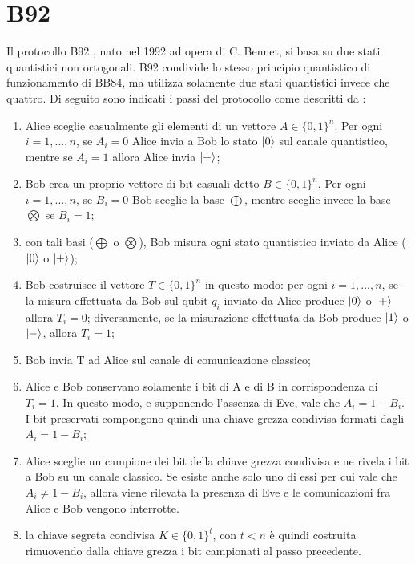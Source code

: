 \section{B92}
Il protocollo B92 \cite{b92}, nato nel 1992 ad opera di C. Bennet, si basa su due stati quantistici non ortogonali. B92 condivide lo stesso principio quantistico di funzionamento di BB84, ma utilizza solamente due stati quantistici invece che quattro.
Di seguito sono indicati i passi del protocollo come descritti da \cite{elboukhari}:
\begin{enumerate}
    \item  Alice sceglie casualmente gli elementi di un vettore $A \in \{0,1\}^n$. Per ogni $i=1,...,n$, se $A_i = 0$ Alice invia a Bob lo stato $\ket{0}$ sul canale quantistico, mentre se $A_i = 1$ allora Alice invia $\ket{+}$;
    \item Bob crea un proprio vettore di bit casuali detto $B \in \{0,1\}^n$. Per ogni $i=1,...,n$, se $B_i = 0$ Bob sceglie la base $\bigoplus$, mentre sceglie invece la base $\bigotimes$ se $B_i = 1$;
    \item con tali basi ($\bigoplus$ o $\bigotimes$), Bob misura ogni stato quantistico inviato da Alice ($\ket{0}$ o $\ket{+}$);
    \item Bob costruisce il vettore $T \in \{0, 1\}^n$ in questo modo: per ogni $i=1,...,n$, se la misura effettuata da Bob sul qubit $q_i$ inviato da Alice produce $\ket{0}$ o $\ket{+}$ allora $T_i = 0$; diversamente, se la misurazione effettuata da Bob produce $\ket{1}$ o $\ket{-}$, allora $T_i = 1$;
    \item Bob invia T ad Alice sul canale di comunicazione classico;
    \item Alice e Bob conservano solamente i bit di A e di B in corrispondenza di $T_i = 1$. In questo modo, e supponendo l'assenza di Eve, vale che $A_i = 1 - B_i$. I bit preservati compongono quindi una chiave grezza condivisa formati dagli $A_i = 1- B_i$;
    \item Alice sceglie un campione dei bit della chiave grezza condivisa e ne rivela i bit a Bob su un canale classico. Se esiste anche solo uno di essi per cui vale che $A_i \neq 1 - B_i$, allora viene rilevata la presenza di Eve e le comunicazioni fra Alice e Bob vengono interrotte.
    \item la chiave segreta condivisa $K \in \{0, 1\}^t$, con $ t < n$ è quindi costruita rimuovendo dalla chiave grezza i bit campionati al passo precedente.
\end{enumerate}

